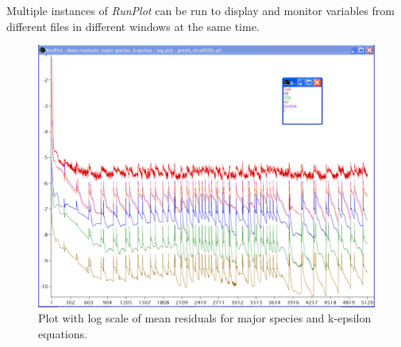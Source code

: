\documentclass[12pt,twoside]{article}
\newcommand{\prog}[1]{\textsl{#1}}
\numberwithin{equation}{section}
\begin{document}
Multiple instances of \prog{RunPlot} can be run to display and monitor variables from different files in different windows at the same time.
\begin{figure}[htbp]
   \centering
   \includegraphics[width=5in]{figs/Runplot-species-resid}
   \caption{Plot with log scale of mean residuals for major species and k-epsilon equations.}
   \label{sample-plot}
\end{figure}
\end{document}
